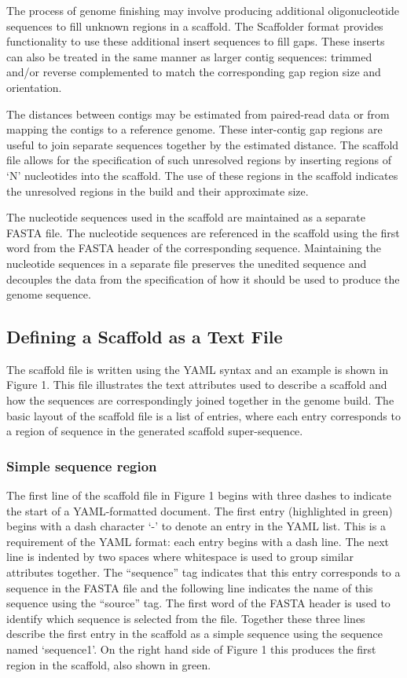 \documentclass[10pt]{bmc_article}
\newenvironment{bmcformat}{\begin{raggedright}\baselineskip20pt\sloppy\setboolean{publ}{false}}{\end{raggedright}\baselineskip20pt\sloppy}
\begin{document}
\begin{bmcformat}
The process of genome finishing may involve producing additional
oligonucleotide sequences to fill unknown regions in a scaffold. The Scaffolder
format provides functionality to use these additional insert sequences to fill
gaps. These inserts can also be treated in the same manner as larger contig
sequences: trimmed and/or reverse complemented to match the corresponding gap
region size and orientation. \pb

The distances between contigs may be estimated from paired-read data or from
mapping the contigs to a reference genome. These inter-contig gap regions are
useful to join separate sequences together by the estimated distance. The
scaffold file allows for the specification of such unresolved regions by
inserting regions of `N' nucleotides into the scaffold. The use of these
regions in the scaffold indicates the unresolved regions in the build and their
approximate size. \pb

The nucleotide sequences used in the scaffold are maintained as a separate
FASTA file. The nucleotide sequences are referenced in the scaffold using the
first word from the FASTA header of the corresponding sequence. Maintaining the
nucleotide sequences in a separate file preserves the unedited sequence and
decouples the data from the specification of how it should be used to produce
the genome sequence. \pb

\subsection*{Defining a Scaffold as a Text File} %

The scaffold file is written using the YAML syntax and an example is shown in
Figure 1. This file illustrates the text attributes used to describe a scaffold
and how the sequences are correspondingly joined together in the genome build.
The basic layout of the scaffold file is a list of entries, where each entry
corresponds to a region of sequence in the generated scaffold super-sequence.
\pb

\subsubsection*{Simple sequence region} %

The first line of the scaffold file in Figure 1 begins with three dashes to
indicate the start of a YAML-formatted document. The first entry (highlighted
in green) begins with a dash character `-' to denote an entry in the YAML list.
This is a requirement of the YAML format: each entry begins with a dash line.
The next line is indented by two spaces where whitespace is used to group
similar attributes together. The ``sequence'' tag indicates that this entry
corresponds to a sequence in the FASTA file and the following line indicates
the name of this sequence using the ``source'' tag. The first word of the FASTA
header is used to identify which sequence is selected from the file. Together
these three lines describe the first entry in the scaffold as a simple sequence
using the sequence named `sequence1'. On the right hand side of Figure 1 this
produces the first region in the scaffold, also shown in green. \pb


\end{bmcformat}
\end{document}
